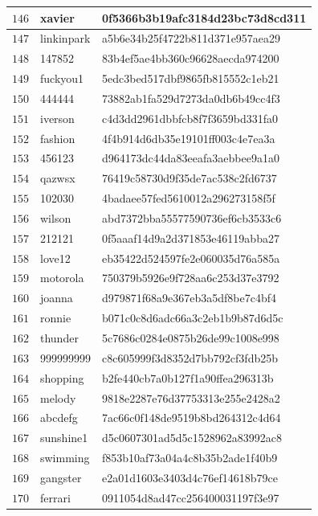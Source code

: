 \begin{longtable}{|l|l|l|}
    $146$ & xavier & 0f5366b3b19afc3184d23bc73d8cd311 \\ \hline
    $147$ & linkinpark & a5b6e34b25f4722b811d371e957aea29 \\ \hline
    $148$ & 147852 & 83b4ef5ae4bb360c96628aecda974200 \\ \hline
    $149$ & fuckyou1 & 5edc3bed517dbf9865fb815552c1eb21 \\ \hline
    $150$ & 444444 & 73882ab1fa529d7273da0db6b49cc4f3 \\ \hline
    $151$ & iverson & c4d3dd2961dbbfcb8f7f3659bd331fa0 \\ \hline
    $152$ & fashion & 4f4b914d6db35e19101ff003c4e7ea3a \\ \hline
    $153$ & 456123 & d964173dc44da83eeafa3aebbee9a1a0 \\ \hline
    $154$ & qazwsx & 76419c58730d9f35de7ac538c2fd6737 \\ \hline
    $155$ & 102030 & 4badaee57fed5610012a296273158f5f \\ \hline
    $156$ & wilson & abd7372bba55577590736ef6cb3533c6 \\ \hline
    $157$ & 212121 & 0f5aaaf14d9a2d371853e46119abba27 \\ \hline
    $158$ & love12 & eb35422d524597fe2e060035d76a585a \\ \hline
    $159$ & motorola & 750379b5926e9f728aa6c253d37e3792 \\ \hline
    $160$ & joanna & d979871f68a9e367eb3a5df8be7c4bf4 \\ \hline
    $161$ & ronnie & b071c0c8d6adc66a3c2eb1b9b87d6d5c \\ \hline
    $162$ & thunder & 5c7686c0284e0875b26de99c1008e998 \\ \hline
    $163$ & 999999999 & c8c605999f3d8352d7bb792cf3fdb25b \\ \hline
    $164$ & shopping & b2fe440cb7a0b127f1a90ffea296313b \\ \hline
    $165$ & melody & 9818e2287e76d37753313e255e2428a2 \\ \hline
    $166$ & abcdefg & 7ac66c0f148de9519b8bd264312c4d64 \\ \hline
    $167$ & sunshine1 & d5c0607301ad5d5c1528962a83992ac8 \\ \hline
    $168$ & swimming & f853b10af73a04a4c8b35b2ade1f40b9 \\ \hline
    $169$ & gangster & e2a01d1603e3403d4c76ef14618b79ce \\ \hline
    $170$ & ferrari & 0911054d8ad47cc256400031197f3e97 \\ \hline

\end{longtable}
